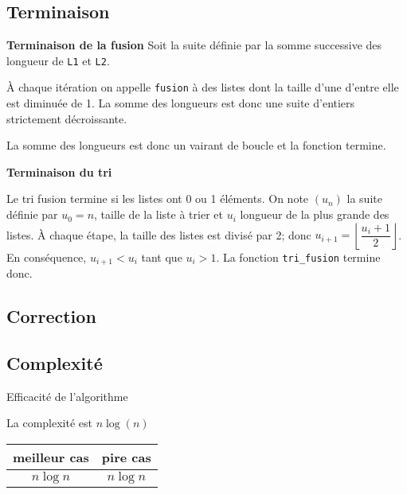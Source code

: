
\subsection{Terminaison}
\textbf{Terminaison de la fusion}
Soit la suite définie par la somme successive des longueur de \texttt{L1} et \texttt{L2}.  	 

À chaque itération on appelle \texttt{fusion} à des listes dont la taille d'une d'entre elle est diminuée de 1. La somme des longueurs est donc une suite d'entiers strictement décroissante. 

La somme des longueurs est donc un vairant de boucle et la fonction termine. 

\textbf{Terminaison du tri}

Le tri fusion termine si les listes ont 0 ou 1 éléments. 
On note $\left(u_n\right)$ la suite définie par $u_0=n$, taille de la liste à trier et $u_i$ longueur de la plus grande des listes. À chaque étape, la taille des listes est divisé par 2; donc $u_{i+1} = \left\lfloor\dfrac{u_i +1 }{2}\right\rfloor$. En conséquence, $u_{i+1}<u_i$ tant que $u_i>1$.  La fonction \texttt{tri\_fusion} termine donc. 



\subsection{Correction}

\subsection{Complexité}

\begin{prop}{Efficacité de l'algorithme}

La complexité est \textbf{$n\log(n)$}

\begin{center}
\begin{tabular}{|c|c|}
\hline 
 meilleur cas &  pire cas \\ 
\hline 
$n \log n$ & $n \log n$ \\ 
\hline 
\end{tabular} 
\end{center}

\end{prop}

